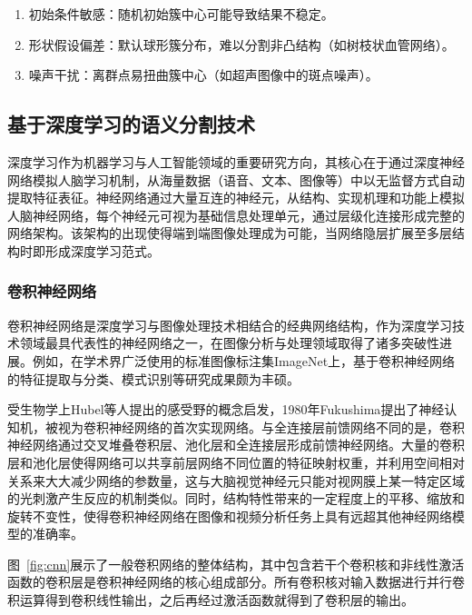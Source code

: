 \begin{enumerate}
    \item 初始条件敏感：随机初始簇中心可能导致结果不稳定。
    \item 形状假设偏差：默认球形簇分布，难以分割非凸结构（如树枝状血管网络）。
    \item 噪声干扰：离群点易扭曲簇中心（如超声图像中的斑点噪声）。
\end{enumerate}

\subsection{基于深度学习的语义分割技术}

深度学习作为机器学习与人工智能领域的重要研究方向，其核心在于通过深度神经网络模拟人脑学习机制，从海量数据（语音、文本、图像等）中以无监督方式自动提取特征表征。神经网络通过大量互连的神经元，从结构、实现机理和功能上模拟人脑神经网络，每个神经元可视为基础信息处理单元，通过层级化连接形成完整的网络架构\cite{qiu2020nndl}。该架构的出现使得端到端图像处理成为可能，当网络隐层扩展至多层结构时即形成深度学习范式。

\subsubsection{卷积神经网络}


卷积神经网络是深度学习与图像处理技术相结合的经典网络结构，作为深度学习技术领域最具代表性的神经网络之一，在图像分析与处理领域取得了诸多突破性进展。例如，在学术界广泛使用的标准图像标注集ImageNet上，基于卷积神经网络的特征提取与分类、模式识别等研究成果颇为丰硕。

受生物学上Hubel等人\cite{hubel1962}提出的感受野的概念启发，1980年Fukushima\cite{fukushima1980}提出了神经认知机，被视为卷积神经网络的首次实现网络。与全连接层前馈网络不同的是，卷积神经网络通过交叉堆叠卷积层、池化层和全连接层形成前馈神经网络。大量的卷积层和池化层使得网络可以共享前层网络不同位置的特征映射权重，并利用空间相对关系来大大减少网络的参数量，这与大脑视觉神经元只能对视网膜上某一特定区域的光刺激产生反应的机制类似。同时，结构特性带来的一定程度上的平移、缩放和旋转不变性，使得卷积神经网络在图像和视频分析任务上具有远超其他神经网络模型的准确率。

图~\ref{fig:cnn}展示了一般卷积网络的整体结构，其中包含若干个卷积核和非线性激活函数的卷积层是卷积神经网络的核心组成部分。所有卷积核对输入数据进行并行卷积运算得到卷积线性输出，之后再经过激活函数就得到了卷积层的输出\cite{Goodfellow-et-al-2016}。

